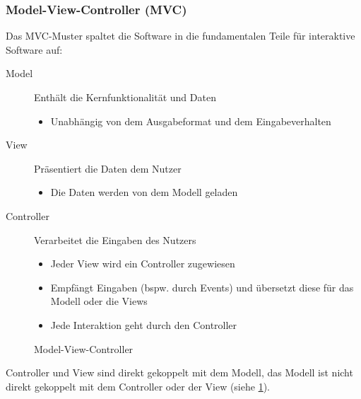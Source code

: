 \documentclass[ngerman]{tuda_summary}
\begin{document}
\subsubsection{Model-View-Controller (MVC)}
Das MVC-Muster spaltet die Software in die fundamentalen Teile für interaktive Software auf:
\begin{description}
    \item[Model] Enthält die Kernfunktionalität und Daten
          \begin{itemize}
              \item Unabhängig von dem Ausgabeformat und dem Eingabeverhalten
          \end{itemize}
    \item[View] Präsentiert die Daten dem Nutzer
          \begin{itemize}
              \item Die Daten werden von dem Modell geladen
          \end{itemize}
    \item[Controller] Verarbeitet die Eingaben des Nutzers
          \begin{itemize}
              \item Jeder View wird ein Controller zugewiesen
              \item Empfängt Eingaben (bspw. durch Events) und übersetzt diese für das Modell oder die Views
              \item Jede Interaktion geht durch den Controller
          \end{itemize}
\end{description}

\begin{figure}[ht]
    \centering
    \caption{Model-View-Controller}
    \label{fig:mvc}
\end{figure}
Controller und View sind direkt gekoppelt mit dem Modell, das Modell ist nicht direkt gekoppelt mit dem Controller oder der View (siehe \ref{fig:mvc}).
\end{document}
